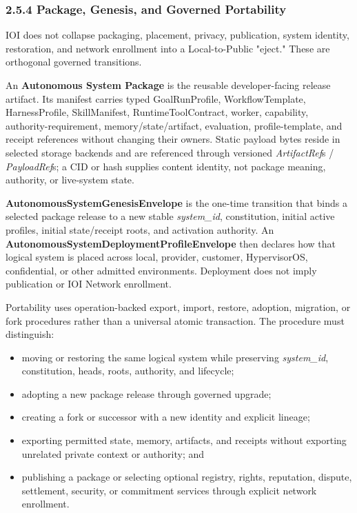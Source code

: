 \documentclass[
  11pt,
]{article}
\providecommand{\tightlist}{%
  \setlength{\itemsep}{0pt}\setlength{\parskip}{0pt}}
\begin{document}
\hypertarget{the-eject-bridge-pointer-based-state-injection}{%
\subsubsection{2.5.4 Package, Genesis, and Governed
Portability}\label{the-eject-bridge-pointer-based-state-injection}}

IOI does not collapse packaging, placement, privacy, publication, system
identity, restoration, and network enrollment into a Local-to-Public
"eject." These are orthogonal governed transitions.

An \textbf{Autonomous System Package} is the reusable developer-facing release
artifact. Its manifest carries typed GoalRunProfile, WorkflowTemplate,
HarnessProfile, SkillManifest, RuntimeToolContract, worker, capability,
authority-requirement, memory/state/artifact, evaluation, profile-template, and
receipt references without changing their owners. Static payload bytes reside in
selected storage backends and are referenced through versioned
\emph{ArtifactRef}s / \emph{PayloadRef}s; a CID or hash supplies content
identity, not package meaning, authority, or live-system state.

\textbf{AutonomousSystemGenesisEnvelope} is the one-time transition that binds
a selected package release to a new stable \emph{system\_id}, constitution,
initial active profiles, initial state/receipt roots, and activation authority.
An \textbf{AutonomousSystemDeploymentProfileEnvelope} then declares how that
logical system is placed across local, provider, customer, HypervisorOS,
confidential, or other admitted environments. Deployment does not imply
publication or IOI Network enrollment.

Portability uses operation-backed export, import, restore, adoption, migration,
or fork procedures rather than a universal atomic transaction. The procedure
must distinguish:

\begin{itemize}
\tightlist
\item
  moving or restoring the same logical system while preserving
  \emph{system\_id}, constitution, heads, roots, authority, and lifecycle;
\item
  adopting a new package release through governed upgrade;
\item
  creating a fork or successor with a new identity and explicit lineage;
\item
  exporting permitted state, memory, artifacts, and receipts without exporting
  unrelated private context or authority; and
\item
  publishing a package or selecting optional registry, rights, reputation,
  dispute, settlement, security, or commitment services through explicit
  network enrollment.
\end{itemize}
\end{document}
